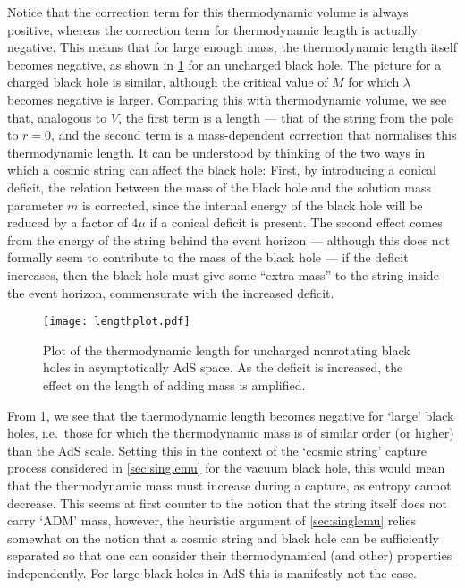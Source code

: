 \documentclass[
twoside,
openright,
frontopenright,
]{dmathesis}
\begin{document}
Notice that the correction term for this thermodynamic volume is always
positive, whereas the correction term for thermodynamic length is actually
negative.  This means that for large enough mass, the thermodynamic length
itself becomes negative, as shown in \cref{fig:TDlength} for an uncharged black
hole. The picture for a charged black hole is similar, although the critical
value of $M$ for which $\lambda$ becomes negative is larger. Comparing this
with thermodynamic volume, we see that, analogous to $V$, the first term is a
length --- that of the string from the pole to $r=0$, and the second term is a
mass-dependent correction that normalises this thermodynamic length.  It can be
understood by thinking of the two ways in which a cosmic string can affect the
black hole: First, by introducing a conical deficit, the relation between the
mass of the black hole and the solution mass parameter $m$ is corrected, since
the internal energy of the black hole will be reduced by a factor of $4\mu$ if a
conical deficit is present.  The second effect comes from the energy of the
string behind the event horizon --- although this does not formally seem to
contribute to the mass of the black hole --- if the deficit increases, then the
black hole must give some ``extra mass'' to the string inside the event horizon,
commensurate with the increased deficit.
\begin{figure}
  \centering
  \texttt{[image: lengthplot.pdf]}
  \caption{\label{fig:TDlength}Plot of the thermodynamic length for uncharged
    nonrotating black holes in asymptotically AdS space. As the deficit is
    increased, the effect on the length of adding mass is amplified.}
\end{figure}


From \cref{fig:TDlength}, we see that the thermodynamic length becomes negative
for `large' black holes, i.e.\ those for which the thermodynamic mass is of
similar order (or higher) than the AdS scale. Setting this in the context of the
`cosmic string' capture process considered in \cref{sec:singlemu} for the vacuum
black hole, this would mean that the thermodynamic mass must increase during a
capture, as entropy cannot decrease. This seems at first counter to the notion
that the string itself does not carry `ADM' mass, however, the heuristic
argument of \cref{sec:singlemu} relies somewhat on the notion that a cosmic
string and black hole can be sufficiently separated so that one can consider
their thermodynamical (and other) properties independently. For large black
holes in AdS this is manifestly not the case.
\end{document}
